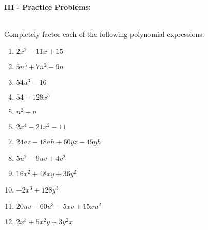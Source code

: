 \documentclass[12pt]{article}
\theoremstyle{definition}
\begin{document}
\ \par
{\bf III - Practice Problems:}\\
\ \par
Completely factor each of the following polynomial expressions.
\begin{multicols}{2}
\begin{enumerate}
  \item $2 x^2 - 11 x + 15$
  \item $5 n^3 + 7 n^2 - 6 n$
  \item $54 u^3 - 16$
  \item $54 - 128 x^3$
  \item $n^2 - n$
  \item $2x^4 -21x^2-11$
	\item $24 a z - 18 a h + 60 y z - 45 y h$
  \item $5 u^2 - 9 u v + 4 v^2$
  \item $16 x^2 + 48 x y + 36 y^2$
  \item $- 2 x^3 + 128 y^3$
  \item $20 u v - 60 u^3 - 5 x v + 15 x u^2$
  \item $2 x^3 + 5 x^2 y + 3 y^2 x$
  \end{enumerate}
\end{multicols}
\newpage
\ \newpage
\end{document}
